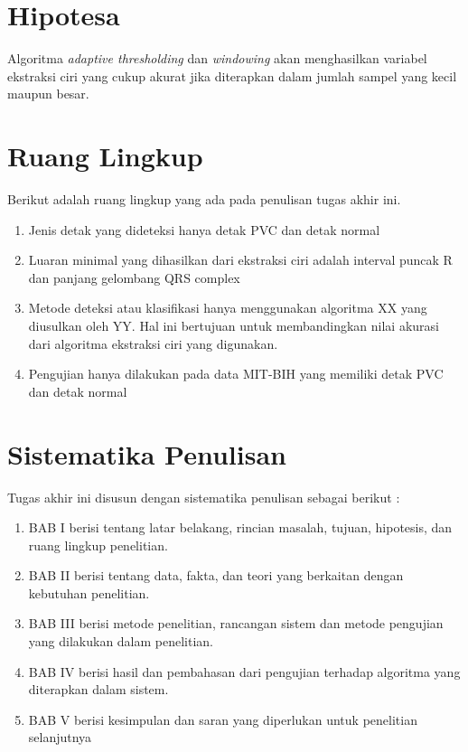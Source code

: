 \section{Hipotesa}
	Algoritma \textit{adaptive thresholding} dan \textit{windowing} akan menghasilkan variabel ekstraksi ciri yang cukup akurat jika diterapkan dalam jumlah sampel yang kecil maupun besar.

\section{Ruang Lingkup}
Berikut adalah ruang lingkup yang ada pada penulisan tugas akhir ini.
\begin{enumerate}
	\item Jenis detak yang dideteksi hanya detak PVC dan detak normal
	\item Luaran minimal yang dihasilkan dari ekstraksi ciri adalah interval puncak R dan panjang gelombang QRS complex
	\item Metode deteksi atau klasifikasi hanya menggunakan algoritma XX yang diusulkan oleh YY. Hal ini bertujuan untuk membandingkan nilai akurasi dari algoritma ekstraksi ciri yang digunakan.
	\item Pengujian hanya dilakukan pada data MIT-BIH yang memiliki detak PVC dan detak normal
\end{enumerate}


\section{Sistematika Penulisan}
Tugas akhir ini disusun dengan sistematika penulisan sebagai berikut : 
\begin{enumerate}
	\item BAB I berisi tentang latar belakang, rincian masalah, tujuan, hipotesis, dan ruang lingkup penelitian.
	\item BAB II berisi tentang data, fakta, dan teori yang berkaitan dengan kebutuhan penelitian.
	\item BAB III berisi metode penelitian, rancangan sistem dan metode pengujian yang dilakukan dalam penelitian.
	\item BAB IV berisi hasil dan pembahasan dari pengujian terhadap algoritma yang diterapkan dalam sistem.
	\item BAB V berisi kesimpulan dan saran yang diperlukan untuk penelitian selanjutnya 
\end{enumerate}
 

\iflogTA
\else


\fi
